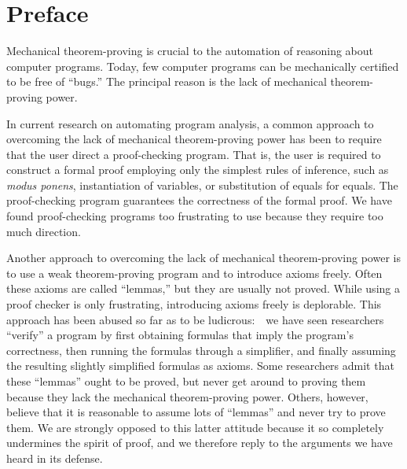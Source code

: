 \documentclass[10pt]{book}
\begin{document}
\chapter{Preface}
\pagestyle{headings}
Mechanical theorem-proving is crucial to the automation of reasoning
about computer programs.  Today, few computer programs can be
mechanically certified to be free of ``bugs.''  The principal reason is
the lack of mechanical theorem-proving power.

In current research on automating program
analysis, a common approach to overcoming the lack of mechanical theorem-proving power has been to require that the user direct a proof-checking program.  That is, the
user  is required to construct a formal proof employing only the
simplest rules of inference,
such as \emph{modus ponens}, instantiation of variables, or substitution of equals
for equals.  The proof-checking program guarantees the correctness
of the formal proof.  We have found proof-checking programs
too frustrating to use because
they require too much direction.

Another approach to overcoming the lack of 
mechanical theorem-proving power is to use a weak theorem-proving program and to introduce axioms freely.
Often these axioms are  called ``lemmas,'' but they are
usually not  proved.  While using a proof checker is
only frustrating, introducing axioms freely is
deplorable.  
This approach has been abused so far as to be ludicrous:~~we have seen researchers ``verify''  a program
by first  obtaining formulas that imply the program's correctness,
then running the formulas
through a simplifier, and finally  assuming the resulting slightly simplified
formulas as axioms.  Some researchers admit
that these ``lemmas'' ought to be proved, but  never
get around to proving them because they lack the mechanical
theorem-proving power.  Others, however,  believe that
it is reasonable to assume lots of ``lemmas'' and never try
to prove them.  We are strongly opposed to this latter attitude
because it so completely undermines the spirit of
proof, and we therefore reply to the arguments
we have heard
in its defense.
\end{document}
